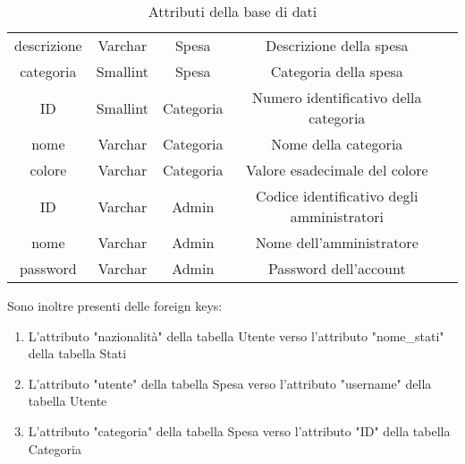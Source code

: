 \documentclass[binding=0.6cm, oneside, noexaminfo, italian]{sapthesis}
\begin{document}
\begin{table}[!ht]
\begin{tabularx}{\linewidth}{ccccX}
        descrizione & Varchar & Spesa & Descrizione della spesa \\
        categoria & Smallint & Spesa & Categoria della spesa \\
        ID & Smallint & Categoria & Numero identificativo della categoria \\
        nome & Varchar & Categoria & Nome della categoria \\
        colore & Varchar & Categoria & Valore esadecimale del colore \\
        ID & Varchar & Admin & Codice identificativo degli amministratori \\
        nome & Varchar & Admin & Nome dell'amministratore \\
        password & Varchar & Admin & Password dell'account \\
    \end{tabularx}
    \caption{Attributi della base di dati}
    \label{tab:attributi}
\end{table}
\newpage
Sono inoltre presenti delle foreign keys:
\begin{enumerate}
    \item L'attributo "nazionalità" della tabella Utente verso l'attributo "nome\_stati" della tabella Stati
    \item L'attributo "utente" della tabella Spesa verso l'attributo "username" della tabella Utente
    \item L'attributo "categoria" della tabella Spesa verso l'attributo "ID" della tabella Categoria
\end{enumerate}
\end{document}
